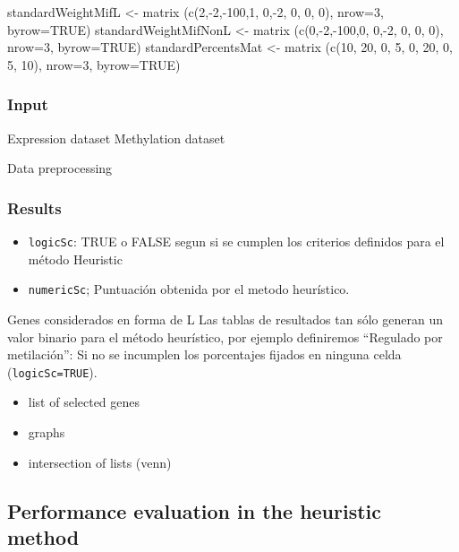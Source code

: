 \documentclass[10pt,letterpaper]{article}
\providecommand{\tightlist}{%
  \setlength{\itemsep}{0pt}\setlength{\parskip}{0pt}}
\begin{document}
standardWeightMifL \textless- matrix (c(2,-2,-100,1, 0,-2, 0, 0, 0),
nrow=3, byrow=TRUE) standardWeightMifNonL \textless- matrix
(c(0,-2,-100,0, 0,-2, 0, 0, 0), nrow=3, byrow=TRUE) standardPercentsMat
\textless- matrix (c(10, 20, 0, 5, 0, 20, 0, 5, 10), nrow=3, byrow=TRUE)

\hypertarget{input}{%
\subsubsection{Input}\label{input}}

Expression dataset Methylation dataset

Data preprocessing

\hypertarget{results-1}{%
\subsubsection{Results}\label{results-1}}

\begin{itemize}
\tightlist
\item
  \texttt{logicSc}: TRUE o FALSE segun si se cumplen los criterios
  definidos para el método Heuristic
\item
  \texttt{numericSc}; Puntuación obtenida por el metodo heurístico.
\end{itemize}

Genes considerados en forma de L Las tablas de resultados tan sólo
generan un valor binario para el método heurístico, por ejemplo
definiremos ``Regulado por metilación'': Si no se incumplen los
porcentajes fijados en ninguna celda (\texttt{logicSc=TRUE}).

\begin{itemize}
\tightlist
\item
  list of selected genes
\item
  graphs
\item
  intersection of lists (venn)
\end{itemize}

\hypertarget{performance-evaluation-in-the-heuristic-method}{%
\subsection{Performance evaluation in the heuristic
method}\label{performance-evaluation-in-the-heuristic-method}}
\end{document}
